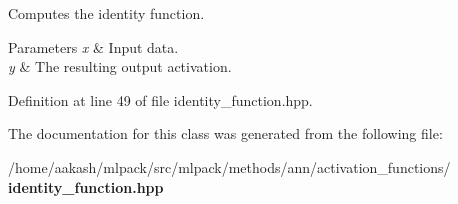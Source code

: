 Computes the identity function. 


\begin{DoxyParams}{Parameters}
{\em x} & Input data. \\
\hline
{\em y} & The resulting output activation. \\
\hline
\end{DoxyParams}


Definition at line 49 of file identity\+\_\+function.\+hpp.



The documentation for this class was generated from the following file\+:\begin{DoxyCompactItemize}
\item 
/home/aakash/mlpack/src/mlpack/methods/ann/activation\+\_\+functions/\textbf{ identity\+\_\+function.\+hpp}\end{DoxyCompactItemize}
